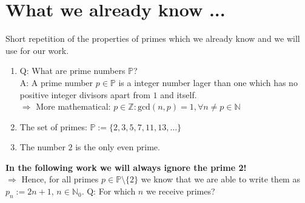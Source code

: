 \section{What we already know ...}
\label{s:whatwealreadyknow}
Short repetition of the properties of primes which we already know and we will use for our work.
\begin{enumerate}
	\item Q: What are prime numbers $\mathbb{P}$? \\
		A: A prime number $p \in \mathbb{P}$ is a integer number lager than one which has no positive integer divisors apart from $1$ and itself. \\
		$\Rightarrow$ More mathematical: $p \in \mathbb{Z}:\mathrm{gcd}\left(n,p\right) = 1, \forall n \neq p \in \mathbb{N}$
	\item The set of primes: $\mathbb{P} := \{ 2, 3, 5, 7, 11, 13, \dots\}$
	\item The number $2$ is the only even prime.
\label{en:propertiesprimes}\end{enumerate}

\textbf{In the following work we will always ignore the prime 2!} \\

$\Rightarrow$ Hence, for all primes $p \in \mathbb{P} \setminus \{2\}$ we know that we are able to write them as $p_{n} := 2n + 1$, $n \in \mathbb{N}_{0}$. Q: For which $n$ we receive primes? \\


